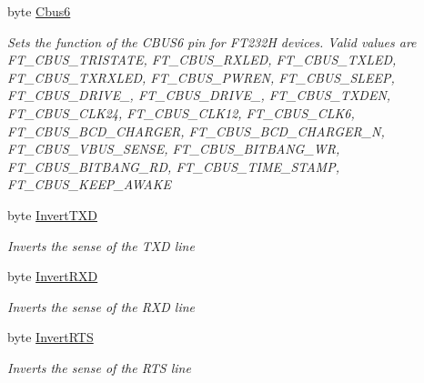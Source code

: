 \begin{DoxyCompactItemize}
byte \mbox{\hyperlink{class_f_t_d2_x_x___n_e_t_1_1_f_t_d_i_1_1_f_t___x_s_e_r_i_e_s___e_e_p_r_o_m___s_t_r_u_c_t_u_r_e_a0334b90cc88fb700b726b7e1e7b12050}{Cbus6}}
\begin{DoxyCompactList}\small\item\em Sets the function of the C\+B\+U\+S6 pin for F\+T232H devices. Valid values are F\+T\+\_\+\+C\+B\+U\+S\+\_\+\+T\+R\+I\+S\+T\+A\+TE, F\+T\+\_\+\+C\+B\+U\+S\+\_\+\+R\+X\+L\+ED, F\+T\+\_\+\+C\+B\+U\+S\+\_\+\+T\+X\+L\+ED, F\+T\+\_\+\+C\+B\+U\+S\+\_\+\+T\+X\+R\+X\+L\+ED, F\+T\+\_\+\+C\+B\+U\+S\+\_\+\+P\+W\+R\+EN, F\+T\+\_\+\+C\+B\+U\+S\+\_\+\+S\+L\+E\+EP, F\+T\+\_\+\+C\+B\+U\+S\+\_\+\+D\+R\+I\+V\+E\+\_, F\+T\+\_\+\+C\+B\+U\+S\+\_\+\+D\+R\+I\+V\+E\+\_, F\+T\+\_\+\+C\+B\+U\+S\+\_\+\+T\+X\+D\+EN, F\+T\+\_\+\+C\+B\+U\+S\+\_\+\+C\+L\+K24, F\+T\+\_\+\+C\+B\+U\+S\+\_\+\+C\+L\+K12, F\+T\+\_\+\+C\+B\+U\+S\+\_\+\+C\+L\+K6, F\+T\+\_\+\+C\+B\+U\+S\+\_\+\+B\+C\+D\+\_\+\+C\+H\+A\+R\+G\+ER, F\+T\+\_\+\+C\+B\+U\+S\+\_\+\+B\+C\+D\+\_\+\+C\+H\+A\+R\+G\+E\+R\+\_\+N, F\+T\+\_\+\+C\+B\+U\+S\+\_\+\+V\+B\+U\+S\+\_\+\+S\+E\+N\+SE, F\+T\+\_\+\+C\+B\+U\+S\+\_\+\+B\+I\+T\+B\+A\+N\+G\+\_\+\+WR, F\+T\+\_\+\+C\+B\+U\+S\+\_\+\+B\+I\+T\+B\+A\+N\+G\+\_\+\+RD, F\+T\+\_\+\+C\+B\+U\+S\+\_\+\+T\+I\+M\+E\+\_\+\+S\+T\+A\+MP, F\+T\+\_\+\+C\+B\+U\+S\+\_\+\+K\+E\+E\+P\+\_\+\+A\+W\+A\+KE \end{DoxyCompactList}\item 
byte \mbox{\hyperlink{class_f_t_d2_x_x___n_e_t_1_1_f_t_d_i_1_1_f_t___x_s_e_r_i_e_s___e_e_p_r_o_m___s_t_r_u_c_t_u_r_e_a66913c60a4a699c4162cacda6577afd4}{Invert\+T\+XD}}
\begin{DoxyCompactList}\small\item\em Inverts the sense of the T\+XD line \end{DoxyCompactList}\item 
byte \mbox{\hyperlink{class_f_t_d2_x_x___n_e_t_1_1_f_t_d_i_1_1_f_t___x_s_e_r_i_e_s___e_e_p_r_o_m___s_t_r_u_c_t_u_r_e_a64681fd17f69f4f325e2c3f111cddd5d}{Invert\+R\+XD}}
\begin{DoxyCompactList}\small\item\em Inverts the sense of the R\+XD line \end{DoxyCompactList}\item 
byte \mbox{\hyperlink{class_f_t_d2_x_x___n_e_t_1_1_f_t_d_i_1_1_f_t___x_s_e_r_i_e_s___e_e_p_r_o_m___s_t_r_u_c_t_u_r_e_a55eb7e5670cd5f08293464a35bb704f9}{Invert\+R\+TS}}
\begin{DoxyCompactList}\small\item\em Inverts the sense of the R\+TS line \end{DoxyCompactList}\item 

\end{DoxyCompactItemize}
